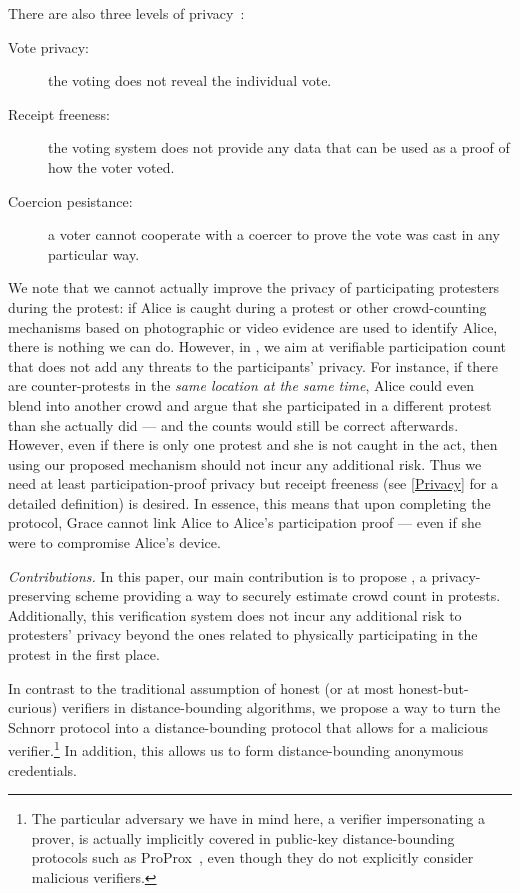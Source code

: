 There are also three levels of privacy~\cite{VerifyingPrivacyPropertiesOfVotingProtocols}:
\begin{description}
  \item[Vote privacy:] the voting does not reveal the individual vote.
  \item[Receipt freeness:] the voting system does not provide any data that can 
    be used as a proof of how the voter voted.
  \item[Coercion pesistance:] a voter cannot cooperate with a coercer to prove 
    the vote was cast in any particular way.
\end{description}
We note that we cannot actually improve the privacy of participating protesters during the protest: if Alice is caught during a protest or other crowd-counting mechanisms based on photographic or video evidence are used to identify Alice, there is nothing we can do. 
However, in \PRIVO, we aim at verifiable participation count that does not add any threats to the participants' privacy. 
For instance, if there are counter-protests in the \emph{same location at the same time}, Alice could even blend into another crowd and argue that she participated in a different protest than she actually did --- and the counts would still be correct afterwards.
However, even if there is only one protest and she is not caught in the act, then using our proposed mechanism should not incur any additional risk.
Thus we need at least participation-proof privacy but receipt freeness (see \cref{Privacy} for a detailed definition) is desired.
In essence, this means that upon completing the protocol, Grace cannot link Alice to Alice's participation proof --- even if she were to compromise Alice's device.

\emph{Contributions.} In this paper, our main contribution is to propose \PRIVO, a privacy-preserving scheme providing a way to securely estimate crowd count in protests.
Additionally, this verification system does not incur any additional risk to protesters' privacy beyond the ones related to physically participating in the protest in the first place.

In contrast to the traditional assumption of honest (or at most honest-but-curious) verifiers in distance-bounding algorithms, we propose a way to turn the Schnorr protocol into a distance-bounding protocol that allows for a malicious verifier.\footnote{The particular adversary we have in mind here, a verifier impersonating a prover, is actually implicitly covered in public-key distance-bounding protocols such as ProProx~\cite{ProProx}, even though they do not explicitly consider malicious verifiers.}
In addition, this allows us to form distance-bounding anonymous credentials.

